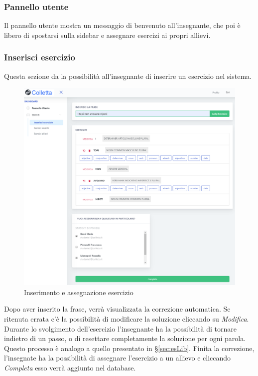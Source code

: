         
        
        \subsubsection{Pannello utente}
          Il pannello utente mostra un messaggio di benvenuto all'insegnante, che poi è libero di spostarsi sulla sidebar e assegnare esercizi ai propri allievi.
        
        
        \subsubsection{Inserisci esercizio}
          Questa sezione da la possibilità all'insegnante di inserire un esercizio nel sistema.
        	\begin{figure}[H]
            	\centering
        		\includegraphics[width=17cm]{sez/img/insegnante/inserisciEsercizio.PNG} 
            	\caption{Inserimento e assegnazione esercizio}\label{fig:1}
        	\end{figure}
        
          Dopo aver inserito la frase, verrà visualizzata la correzione automatica. Se ritenuta errata c'è la possibilità di modificare la soluzione cliccando su \textit{Modifica}. Durante lo svolgimento dell'esercizio l'insegnante ha la possibilità di tornare indietro di un passo, o di resettare completamente la soluzione per ogni parola. Questo processo è analogo a quello presentato in \S\ref{sec:esLib}. Finita la correzione, l'insegnate ha la possibilità di assegnare l'esercizio a un allievo e cliccando \textit{Completa} esso verrà aggiunto nel database.
        
